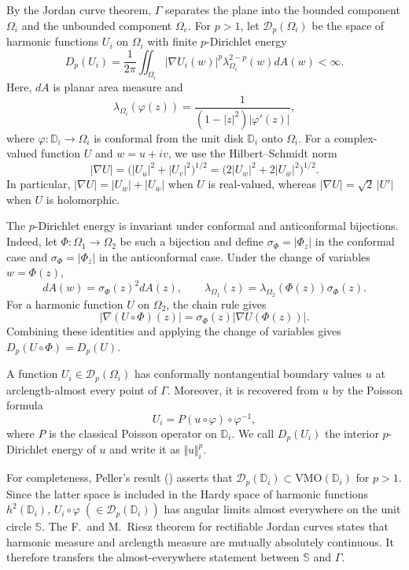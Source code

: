 \documentclass[11pt]{article}
\numberwithin{equation}{section}
\theoremstyle{remark}
\begin{document}
By the Jordan curve theorem, $\Gamma$ separates the plane into the bounded
component $\Omega_i$ and the unbounded component $\Omega_e$.  For $p>1$, let
$\mathcal D_p(\Omega_i)$ be the space of harmonic functions $U_i$ on
$\Omega_i$ with finite $p$-Dirichlet energy
\begin{equation}
    D_p(U_i) = \frac{1}{2\pi}\iint_{\Omega_i}|\nabla U_i(w)|^p \lambda_{\Omega_i}^{2-p}(w) dA(w) < \infty.
\end{equation} 
Here, $dA$ is planar area measure and
\[
\lambda_{\Omega_i}(\varphi(z))
=\frac{1}{(1-|z|^2)|\varphi'(z)|},
\]
where $\varphi:\mathbb D_i\to\Omega_i$ is conformal from the unit disk $\mathbb D_i$ onto $\Omega_i$.  For a
complex-valued function $U$ and $w=u+iv$, we use the Hilbert--Schmidt norm
\begin{equation}\label{gradient-complex}
|\nabla U|=\bigl(|U_u|^2+|U_v|^2\bigr)^{1/2}
=\bigl(2|U_w|^2+2|U_{\bar w}|^2\bigr)^{1/2}.
\end{equation}
In particular, $|\nabla U|=|U_w|+|U_{\bar w}|$ when $U$ is
real-valued, whereas $|\nabla U|=\sqrt2\,|U'|$ when $U$ is holomorphic.


The $p$-Dirichlet energy is invariant under conformal and
anticonformal bijections.  Indeed, let $\Phi:\Omega_1\to\Omega_2$ be such a
bijection and define $\sigma_\Phi=|\Phi_z|$ in the conformal case and
$\sigma_\Phi=|\Phi_{\bar z}|$ in the anticonformal case.  Under the change of
variables $w=\Phi(z)$,
$$
dA(w) = \sigma_\Phi(z)^2 dA(z), \qquad \lambda_{\Omega_1}(z) = \lambda_{\Omega_2}(\Phi(z))\sigma_{\Phi}(z).
$$
For a harmonic function $U$ on $\Omega_2$, the chain rule gives 
 $$
 |\nabla(U\circ\Phi)(z)| = \sigma_\Phi(z)|\nabla U(\Phi(z))|.
 $$
Combining these identities and applying the change of variables gives
$D_p(U\circ\Phi)=D_p(U)$.


A function $U_i\in\mathcal D_p(\Omega_i)$ has conformally
nontangential boundary values $u$ at arclength-almost every point of $\Gamma$.
Moreover, it is recovered from $u$ by the Poisson formula
$$
U_i = P(u\circ\varphi)\circ\varphi^{-1},
$$
where $P$ is the classical Poisson operator on $\mathbb D_i$.  We call
$D_p(U_i)$ the interior $p$-Dirichlet energy of $u$ and write it as
$\Vert u\Vert_i^p$.

For completeness, Peller's result (\cite{pel}) asserts that  $\mathcal{D}_p(\mathbb{D}_i)\subset \text{VMO}(\mathbb{D}_i)$ for  $p >1$. Since the latter space is  included in the Hardy space of harmonic functions $h^2(\mathbb{D}_i)$, $U_i\circ\varphi \; (\in \mathcal D_p(\mathbb D_i))$ has angular limits almost everywhere on the unit circle $\mathbb S$.   The F.~and M.~Riesz
theorem for rectifiable Jordan curves states that harmonic measure and arclength measure are mutually absolutely continuous. It therefore transfers the almost-everywhere
statement between $\mathbb S$ and $\Gamma$.  
\end{document}
